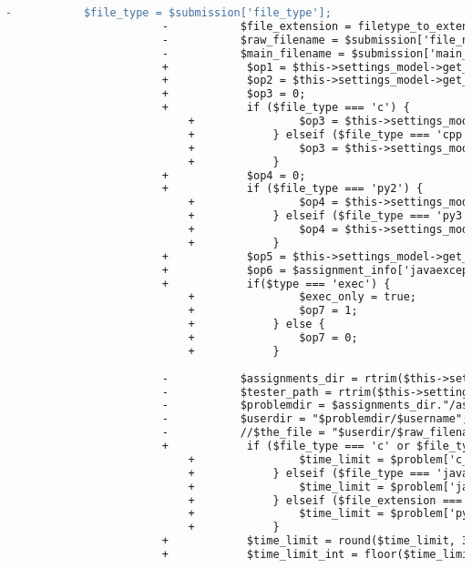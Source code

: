 \begin{lstlisting}[language=diff, caption=Perubahan pada kode Queueprocess.php]
						-			$file_type = $submission['file_type'];
						-			$file_extension = filetype_to_extension($file_type);
						-			$raw_filename = $submission['file_name'];
						-			$main_filename = $submission['main_file_name'];
						+            $op1 = $this->settings_model->get_setting('enable_log');
						+            $op2 = $this->settings_model->get_setting('enable_easysandbox');
						+            $op3 = 0;
						+            if ($file_type === 'c') {
							+                $op3 = $this->settings_model->get_setting('enable_c_shield');
							+            } elseif ($file_type === 'cpp') {
							+                $op3 = $this->settings_model->get_setting('enable_cpp_shield');
							+            }
						+            $op4 = 0;
						+            if ($file_type === 'py2') {
							+                $op4 = $this->settings_model->get_setting('enable_py2_shield');
							+            } elseif ($file_type === 'py3') {
							+                $op4 = $this->settings_model->get_setting('enable_py3_shield');
							+            }
						+            $op5 = $this->settings_model->get_setting('enable_java_policy');
						+            $op6 = $assignment_info['javaexceptions'];
						+            if($type === 'exec') {
							+                $exec_only = true;
							+                $op7 = 1;
							+            } else {
							+                $op7 = 0;
							+            }
						
						-			$assignments_dir = rtrim($this->settings_model->get_setting('assignments_root'), '/');
						-			$tester_path = rtrim($this->settings_model->get_setting('tester_path'), '/');
						-			$problemdir = $assignments_dir."/assignment_$assignment/p".$problem['id'];
						-			$userdir = "$problemdir/$username";
						-			//$the_file = "$userdir/$raw_filename.$file_extension";
						+            if ($file_type === 'c' or $file_type === 'cpp') {
							+                $time_limit = $problem['c_time_limit'] / 1000;
							+            } elseif ($file_type === 'java') {
							+                $time_limit = $problem['java_time_limit'] / 1000;
							+            } elseif ($file_extension === 'py') {
							+                $time_limit = $problem['python_time_limit'] / 1000;
							+            }
						+            $time_limit = round($time_limit, 3);
						+            $time_limit_int = floor($time_limit) + 1;
						

\end{lstlisting}
